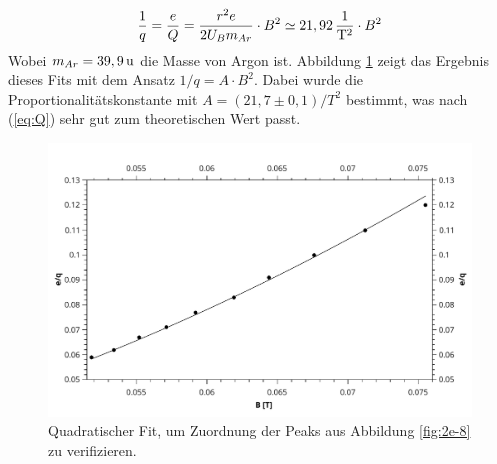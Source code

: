 		\begin{equation} \label{eq:Q}
		\frac{1}{q} = \frac{e}{Q} = \frac{r^2 e}{2 U_B m_{Ar}}\cdot B^2 \simeq \unit[21,92]{\frac{1}{T^2}} \cdot B^2
		\end{equation} 
		Wobei $m_{Ar} = \unit[39,9]{u}$ die Masse von Argon ist. Abbildung \ref{fig:quadr_fit} zeigt das Ergebnis dieses Fits mit dem Ansatz $1/q = A\cdot B^2$. Dabei wurde die Proportionalitätskonstante mit $A = (21,7 \pm 0,1)\unit{/T^2}$ bestimmt, was nach (\ref{eq:Q}) sehr gut zum theoretischen Wert passt.\\
		\begin{figure}[htb]
			\centering
			\includegraphics[width=\linewidth]{pic/quadr_fit.pdf}
			\caption{Quadratischer Fit, um Zuordnung der Peaks aus Abbildung \ref{fig:2e-8} zu verifizieren.}
			\label{fig:quadr_fit}	
		\end{figure}
